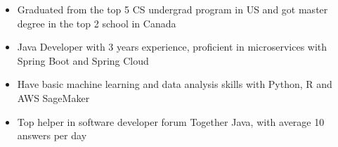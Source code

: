 \documentclass[localFont,alternative]{resume_template}
\begin{document}
	\makecvheader

    \begin{itemize}
        \item Graduated from the top 5 CS undergrad program in US and got master degree in the top 2 school in Canada
        \item Java Developer with 3 years experience, proficient in microservices with Spring Boot and Spring Cloud
        \item Have basic machine learning and data analysis skills with Python, R and AWS SageMaker
        \item Top helper in software developer forum Together Java, with average 10 answers per day
    \end{itemize}

    \vspace{5pt}
\end{document}
